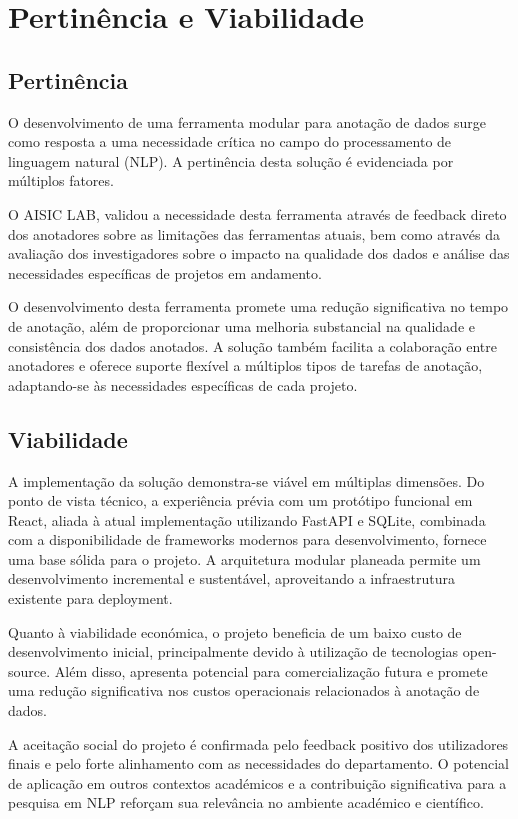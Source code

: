 \chapter{Pertinência e Viabilidade}

\section{Pertinência}
O desenvolvimento de uma ferramenta modular para anotação de dados surge como resposta a uma necessidade crítica no campo do processamento de linguagem natural (NLP). A pertinência desta solução é evidenciada por múltiplos fatores.

O AISIC LAB, validou a necessidade desta ferramenta através de feedback direto dos anotadores sobre as limitações das ferramentas atuais, bem como através da avaliação dos investigadores sobre o impacto na qualidade dos dados e análise das necessidades específicas de projetos em andamento.

O desenvolvimento desta ferramenta promete uma redução significativa no tempo de anotação, além de proporcionar uma melhoria substancial na qualidade e consistência dos dados anotados. A solução também facilita a colaboração entre anotadores e oferece suporte flexível a múltiplos tipos de tarefas de anotação, adaptando-se às necessidades específicas de cada projeto.

\section{Viabilidade}
A implementação da solução demonstra-se viável em múltiplas dimensões. Do ponto de vista técnico, a experiência prévia com um protótipo funcional em React, aliada à atual implementação utilizando FastAPI e SQLite, combinada com a disponibilidade de frameworks modernos para desenvolvimento, fornece uma base sólida para o projeto. A arquitetura modular planeada permite um desenvolvimento incremental e sustentável, aproveitando a infraestrutura existente para deployment.

Quanto à viabilidade económica, o projeto beneficia de um baixo custo de desenvolvimento inicial, principalmente devido à utilização de tecnologias open-source. Além disso, apresenta potencial para comercialização futura e promete uma redução significativa nos custos operacionais relacionados à anotação de dados.

A aceitação social do projeto é confirmada pelo feedback positivo dos utilizadores finais e pelo forte alinhamento com as necessidades do departamento. O potencial de aplicação em outros contextos académicos e a contribuição significativa para a pesquisa em NLP reforçam sua relevância no ambiente académico e científico.

